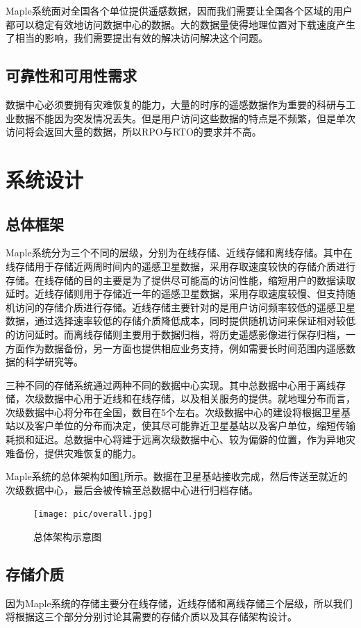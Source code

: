 \documentclass{article}
\begin{document}
Maple系统面对全国各个单位提供遥感数据，因而我们需要让全国各个区域的用户都可以稳定有效地访问数据中心的数据。大的数据量使得地理位置对下载速度产生了相当的影响，我们需要提出有效的解决访问解决这个问题。

\subsection{可靠性和可用性需求}
数据中心必须要拥有灾难恢复的能力，大量的时序的遥感数据作为重要的科研与工业数据不能因为突发情况丢失。但是用户访问这些数据的特点是不频繁，但是单次访问将会返回大量的数据，所以RPO与RTO的要求并不高。

\section{系统设计}
\subsection{总体框架}
Maple系统分为三个不同的层级，分别为在线存储、近线存储和离线存储。其中在线存储用于存储近两周时间内的遥感卫星数据，采用存取速度较快的存储介质进行存储。在线存储的目的主要是为了提供尽可能高的访问性能，缩短用户的数据读取延时。近线存储则用于存储近一年的遥感卫星数据，采用存取速度较慢、但支持随机访问的存储介质进行存储。近线存储主要针对的是用户访问频率较低的遥感卫星数据，通过选择速率较低的存储介质降低成本，同时提供随机访问来保证相对较低的访问延时。而离线存储则主要用于数据归档，将历史遥感影像进行保存归档，一方面作为数据备份，另一方面也提供相应业务支持，例如需要长时间范围内遥感数据的科学研究等。

三种不同的存储系统通过两种不同的数据中心实现。其中总数据中心用于离线存储，次级数据中心用于近线和在线存储，以及相关服务的提供。就地理分布而言，次级数据中心将分布在全国，数目在5个左右。次级数据中心的建设将根据卫星基站以及客户单位的分布而决定，使其尽可能靠近卫星基站以及客户单位，缩短传输耗损和延迟。总数据中心将建于远离次级数据中心、较为偏僻的位置，作为异地灾难备份，提供灾难恢复的能力。

Maple系统的总体架构如图\ref{overall}所示。数据在卫星基站接收完成，然后传送至就近的次级数据中心，最后会被传输至总数据中心进行归档存储。

\begin{figure}[H]
\centering 
\texttt{[image: pic/overall.jpg]}
\caption{总体架构示意图}
\label{overall}
\end{figure}

\subsection{存储介质}
因为Maple系统的存储主要分在线存储，近线存储和离线存储三个层级，所以我们将根据这三个部分分别讨论其需要的存储介质以及其存储架构设计。
\end{document}

